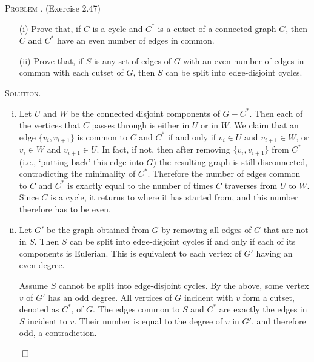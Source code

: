 \documentclass[12pt, a4paper, oneside]{ctexart}
\newcounter{problemname}
\newenvironment{problem}{\begin{framed}\stepcounter{problemname}\par\noindent\textsc{Problem \arabic{problemname}. }}{\end{framed}\par}
\newenvironment{solution}{%
	\par\noindent\textsc{Solution. }\ignorespaces
}{%
	\hfill$\qed$\par
}
\begin{document}
	\begin{problem}
		(Exercise 2.47)

        \begin{itemize}
            \item[(i)] Prove that, if $C$ is a cycle and $C^*$ is a cutset of a connected graph $G$, then $C$ and $C^*$ have an even number of edges in common.
            \item[(ii)] Prove that, if $S$ is any set of edges of $G$ with an even number of edges in common with each cutset of $G$, then $S$ can be split into edge-disjoint cycles.
        \end{itemize}

    \end{problem}

	\begin{solution}
		
		\begin{enumerate}[(i)]
			\item Let \( U \) and \( W \) be the connected disjoint components of \( G - C^* \). 
			Then each of the vertices that \( C \) passes through is either in \( U \) or in \( W \). 
			We claim that an edge \( \{v_i, v_{i+1}\} \) is common to \( C \) and \( C^* \) if and only if \( v_i \in U \) 
			and \( v_{i+1} \in W \), or \( v_i \in W \) and \( v_{i+1} \in U \). 
			In fact, if not, then after removing \( \{v_i, v_{i+1}\} \) from \( C^* \) (i.e., `putting back' this edge into \( G \)) 
			the resulting graph is still disconnected, contradicting the minimality of \( C^* \). 
			Therefore the number of edges common to \( C \) and \( C^* \) is exactly equal to the number of times \( C \) traverses from \( U \) to \( W \). 
			Since \( C \) is a cycle, it returns to where it has started from, and this number therefore has to be even.
			\item Let \( G' \) be the graph obtained from \( G \) by removing all edges of \( G \) that are not in \( S \). 
			Then \( S \) can be split into edge-disjoint cycles if and only if each of its components is Eulerian. 
			This is equivalent to each vertex of \( G' \) having an even degree.
			
			Assume \( S \) cannot be split into edge-disjoint cycles. By the above, some vertex \( v \) of \( G' \) has an odd degree. 
			All vertices of \( G \) incident with \( v \) form a cutset, denoted as \( C^* \), of \( G \). 
			The edges common to \( S \) and \( C^* \) are exactly the edges in \( S \) incident to \( v \). 
			Their number is equal to the degree of \( v \) in \( G' \), and therefore odd, a contradiction.
			
		\end{enumerate}
		

		
	\end{solution}
\end{document}
